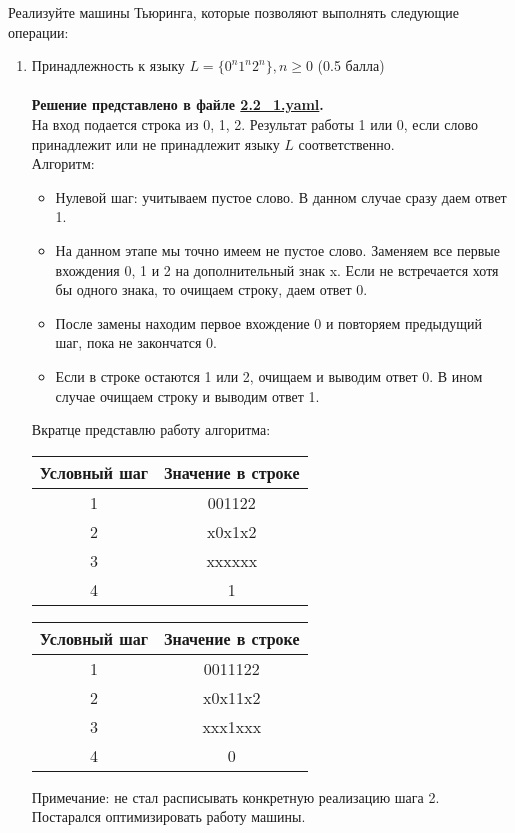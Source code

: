 \documentclass{article}
\begin{document}
Реализуйте машины Тьюринга, которые позволяют выполнять следующие операции:
\begin{enumerate}
    \item Принадлежность к языку $L = \{ 0^n1^n2^n \}, n \ge 0$ (0.5 балла) \\ \\
    \textbf{Решение представлено в файле \href{https://github.com/NRU-MPEI-IMAI/tm-and-qc-s3tout/blob/main/TMV3/2.2_1.yaml}{2.2\_1.yaml}.} \\
    На вход подается строка из 0, 1, 2. Результат работы 1 или 0, если слово принадлежит или не принадлежит языку $L$ соответственно. \\
    Алгоритм:
    \begin{itemize}
        \item Нулевой шаг: учитываем пустое слово. В данном случае сразу даем ответ 1. 
        \item На данном этапе мы точно имеем не пустое слово. Заменяем все первые вхождения 0, 1 и 2 на дополнительный знак x. Если не встречается хотя бы одного знака, то очищаем строку, даем ответ 0. 
        \item После замены находим первое вхождение 0 и повторяем предыдущий шаг, пока не закончатся 0. 
        \item Если в строке остаются 1 или 2, очищаем и выводим ответ 0. В ином случае очищаем строку и выводим ответ 1. 
    \end{itemize}
    Вкратце представлю работу алгоритма: 
    \begin{center}
    \begin{tabular}{c|c}
        Условный шаг    & Значение в строке     \\ \hline
        1   & 001122        \\
        2   & x0x1x2        \\
        3   & xxxxxx        \\
        4   & 1
    \end{tabular} 
        \begin{tabular}{c|c}
        Условный шаг    & Значение в строке     \\ \hline
        1   & 0011122       \\
        2   & x0x11x2        \\
        3   & xxx1xxx        \\
        4   & 0
    \end{tabular}
    \end{center}
    Примечание: не стал расписывать конкретную реализацию шага 2. Постарался оптимизировать работу машины. 
    

\end{enumerate}
\end{document}
